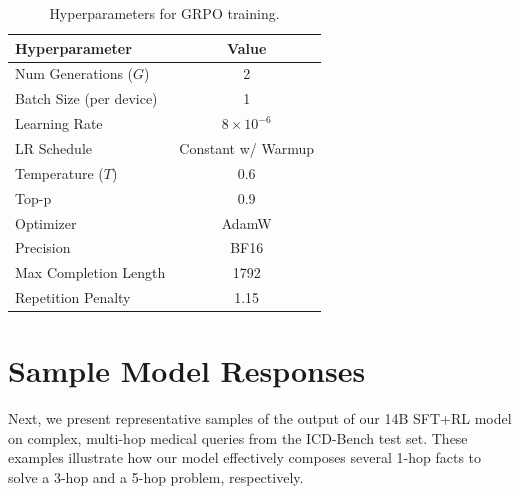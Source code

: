 \documentclass{article}
\theoremstyle{plain}
\theoremstyle{definition}
\theoremstyle{remark}
\begin{document}
\begin{table}[H]
\caption{Hyperparameters for GRPO training.}
\label{tab:grpo_hyperparams}
\vskip 0.15in
\begin{center}
\begin{small}
\begin{sc}
\begin{tabular}{lc}
\toprule
Hyperparameter & Value \\
\midrule
Num Generations ($G$) & 2 \\
Batch Size (per device) & 1 \\
Learning Rate & $8 \times 10^{-6}$ \\
LR Schedule & Constant w/ Warmup \\
Temperature ($T$) & 0.6 \\
Top-p & 0.9 \\
Optimizer & AdamW \\
Precision & BF16 \\
Max Completion Length & 1792 \\
Repetition Penalty & 1.15 \\
\bottomrule
\end{tabular}
\end{sc}
\end{small}
\end{center}
\vskip -0.1in
\end{table}


\newpage
\section{Sample Model Responses}
\label{Appendix F}
Next, we present representative samples of the output of our 14B SFT+RL model on complex, multi-hop medical queries from the ICD-Bench test set. These examples illustrate how our model effectively composes several 1-hop facts to solve a 3-hop and a 5-hop problem, respectively. \\


\end{document}
